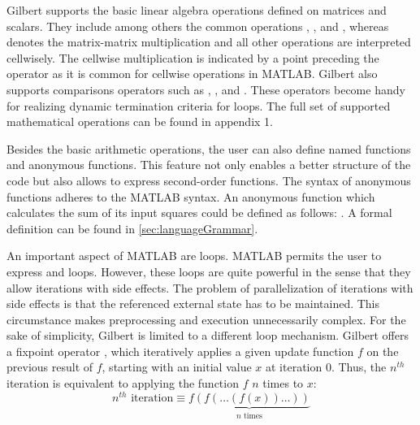 Gilbert supports the basic linear algebra operations defined on matrices and scalars.
They include among others the common operations \code{+}, \code{-}, \code{/} and \code{*}, whereas \code{*} denotes the matrix-matrix multiplication and all other operations are interpreted cellwisely.
The cellwise multiplication is indicated by a point preceding the operator as it is common for cellwise operations in MATLAB.
Gilbert also supports comparisons operators such as \code{>}, \code{>=}, \code{==} and \code{\textasciitilde=}.
These operators become handy for realizing dynamic termination criteria for loops.
The full set of supported mathematical operations can be found in appendix 1.

Besides the basic arithmetic operations, the user can also define named functions and anonymous functions.
This feature not only enables a better structure of the code but also allows to express second-order functions.
The syntax of anonymous functions adheres to the MATLAB syntax.
An anonymous function which calculates the sum of its input squares could be defined as follows: .
A formal definition can be found in \cref{sec:languageGrammar}.

An important aspect of MATLAB are loops.
MATLAB permits the user to express  and  loops.
However, these loops are quite powerful in the sense that they allow iterations with side effects.
The problem of parallelization of iterations with side effects is that the referenced external state has to be maintained.
This circumstance makes preprocessing and execution unnecessarily complex.
For the sake of simplicity, Gilbert is limited to a different loop mechanism.
Gilbert offers a fixpoint operator , which iteratively applies a given update function $f$ on the previous result of $f$, starting with an initial value $x$ at iteration $0$.
Thus, the $n^{th}$ iteration is equivalent to applying the function $f$ $n$ times to $x$: 
\begin{displaymath}
  n^{th}\text{ iteration}\equiv\underbrace{f(f(\ldots(f(x))\ldots))}_{\text{$n$ times}}
\end{displaymath}

